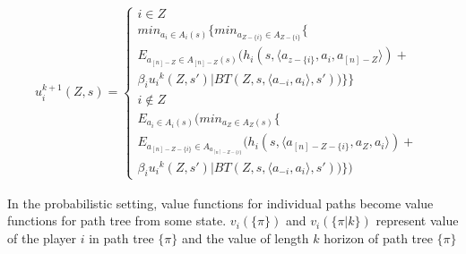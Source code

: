  
\begin{equation}
\begin{split}
u_{i}^{k+1}(Z,s)=
\begin{cases}
i \in Z &
\\min _{a_i \in A_i(s)} \{
min_{a_{Z-\{i\}} \in A_{Z-\{i\}}}\{
\\E_{a_{[n]-Z} \in A_{[n]-Z}(s)} (h_i(s,\langle a_{z-\{i\}},a_i,a_{[n]-Z} \rangle) +\\ \beta_i{u_i}^{k}(Z,s') | BT(Z,s,\langle a_{-i},a_i \rangle,s')  )\} \}\\
i \notin Z &
\\E_{a_i \in A_i(s)} (
min _{a_{Z} \in A_{Z}(s)}\{
 \\E_{a_{[n]-Z-\{i\}} \in A_{a_{[n]-Z-\{i\}}}} (h_i(s,\langle a_{[n]-Z-\{i\}},a_{Z},a_i \rangle) + \\ \beta_i{u_i}^{k}(Z,s') | BT(Z,s,\langle a_{-i},a_i \rangle,s')  )\} )
\end{cases}
\end{split}
\end{equation}

In the probabilistic setting, value functions for individual paths become value functions for  path tree from some state. $v_i(\{\pi\})$ and $v_i(\{\pi|k\})$ represent value of the player $i$ in path tree $\{\pi\}$ and the value of length $k$ horizon of path tree $\{\pi\}$  


%
%



